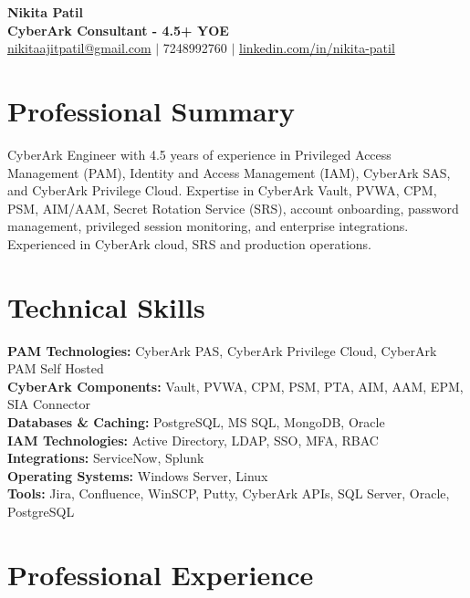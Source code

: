 \documentclass[a4paper,11pt]{article}
\begin{document}
\begin{center}
    {\LARGE \textbf{Nikita Patil}} \\[1pt]
    \textbf{CyberArk Consultant - 4.5+ YOE} \\[1pt]
    \href{mailto:nikitaajitpatil@gmail.com}{nikitaajitpatil@gmail.com} $|$ 7248992760 $|$ 
    \href{https://www.linkedin.com/in/nikita-patil}{linkedin.com/in/nikita-patil}
\end{center}


\section{Professional Summary}
\vspace{2pt}
CyberArk Engineer with 4.5 years of experience in Privileged Access Management (PAM), Identity and Access Management (IAM), CyberArk SAS, and CyberArk Privilege Cloud. Expertise in CyberArk Vault, PVWA, CPM, PSM, AIM/AAM, Secret Rotation Service (SRS), account onboarding, password management, privileged session monitoring, and enterprise integrations. Experienced in CyberArk cloud, SRS and production operations.


\vspace{4pt}
\section{Technical Skills}\vspace{4pt}

\textbf{PAM Technologies:} CyberArk PAS, CyberArk Privilege Cloud, CyberArk PAM Self Hosted \\
\textbf{CyberArk Components:} Vault, PVWA, CPM, PSM, PTA, AIM, AAM, EPM, SIA Connector\\
\textbf{Databases \& Caching:} PostgreSQL, MS SQL, MongoDB, Oracle \\
\textbf{IAM Technologies:} Active Directory, LDAP, SSO, MFA, RBAC\\
\textbf{Integrations:} ServiceNow, Splunk\\
\textbf{Operating Systems:} Windows Server, Linux\\
\textbf{Tools:} Jira, Confluence, WinSCP, Putty, CyberArk APIs, SQL Server, Oracle, PostgreSQL\\

\section{Professional Experience}
\vspace{4pt}
\end{document}
